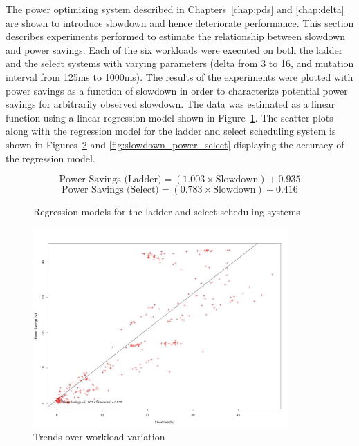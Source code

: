 The power optimizing system described in Chapters~\ref{chap:pds} and \ref{chap:delta} are shown
to introduce slowdown and hence deteriorate performance. This section describes experiments 
performed to estimate the relationship between slowdown and power savings. Each of the six
workloads were executed on both the ladder and the select systems with varying parameters
(delta from 3 to 16, and mutation interval from 125ms to 1000ms). The results of the experiments
were plotted with power savings as a function of slowdown in order to characterize potential 
power savings for arbitrarily observed slowdown. The data was estimated as a linear function
using a linear regression model shown in Figure~\ref{fig:regression}. The scatter plots along
with the regression model for the ladder and select scheduling system is shown in Figures~\ref{fig:slowdown_power_ladder}
and \ref{fig:slowdown_power_select} displaying the accuracy of the regression model. 

\begin{figure}[h!]
   \begin{equation*}
      \text{Power Savings (Ladder)} = (1.003 \times \text{Slowdown}) + 0.935
    \end{equation*}
    \begin{equation*}
     \text{Power Savings (Select)}  = (0.783 \times \text{Slowdown}) + 0.416
  \end{equation*}
  \caption{Regression models for the ladder and select scheduling systems}
  \label{fig:regression}
\end{figure}

\begin{figure}[h!]
  \begin{center}
    \includegraphics[height=3.0in]{figures/slowdown_power_ladder.jpg}
    \caption{Trends over workload variation}
    \label{fig:slowdown_power_ladder}
  \end{center}
\end{figure}


